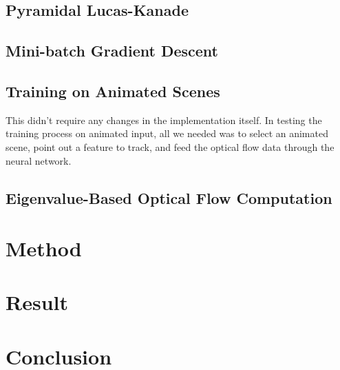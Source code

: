 \documentclass[]{article}
\begin{document}
\subsection{Pyramidal Lucas-Kanade}\label{subsec:pyramidal-lucas-kanade}
\subsection{Mini-batch Gradient Descent}\label{subsec:mini-batch-gradient-descent}
\subsection{Training on Animated Scenes}\label{subsec:training-on-animated-scenes}
This didn't require any changes in the implementation itself.
In testing the training process on animated input, all we needed was to select an animated scene, point out a feature to track, and feed the optical flow data through the neural network.

\subsection{Eigenvalue-Based Optical Flow Computation}\label{subsec:eigenvalue-based-optical-flow-computation}

\section{Method}\label{sec:method}

\section{Result}\label{sec:result}

\section{Conclusion}\label{sec:conclusion}

\pagebreak
\listoftables
\listoffigures
\printbibliography[heading=bibintoc]{}
\end{document}
